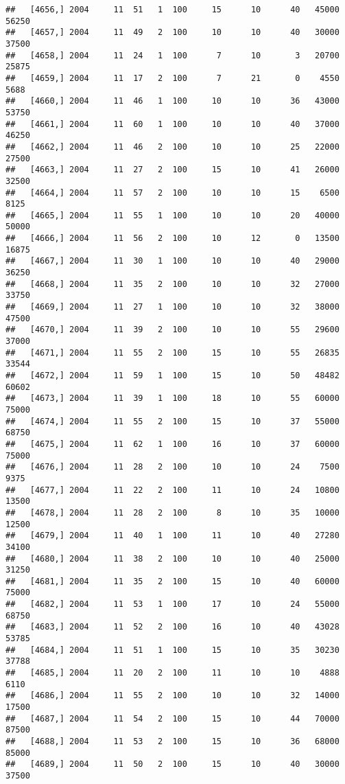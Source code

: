 \documentclass{article}\usepackage[]{graphicx}\usepackage[]{color}
\makeatletter
\newenvironment{kframe}{%
 \def\at@end@of@kframe{}%
 \ifinner\ifhmode%
  \def\at@end@of@kframe{\end{minipage}}%
  \begin{minipage}{\columnwidth}%
 \fi\fi%
 \def\FrameCommand##1{\hskip\@totalleftmargin \hskip-\fboxsep
 \colorbox{shadecolor}{##1}\hskip-\fboxsep
     \hskip-\linewidth \hskip-\@totalleftmargin \hskip\columnwidth}%
 \MakeFramed {\advance\hsize-\width
   \@totalleftmargin\z@ \linewidth\hsize
   \@setminipage}}%
 {\par\unskip\endMakeFramed%
 \at@end@of@kframe}
\newenvironment{knitrout}{}{} %
\makeatother
\begin{document}
\begin{knitrout}
\begin{kframe}
\begin{verbatim}
##   [4656,] 2004     11  51   1  100     15      10      40   45000   56250
##   [4657,] 2004     11  49   2  100     10      10      40   30000   37500
##   [4658,] 2004     11  24   1  100      7      10       3   20700   25875
##   [4659,] 2004     11  17   2  100      7      21       0    4550    5688
##   [4660,] 2004     11  46   1  100     10      10      36   43000   53750
##   [4661,] 2004     11  60   1  100     10      10      40   37000   46250
##   [4662,] 2004     11  46   2  100     10      10      25   22000   27500
##   [4663,] 2004     11  27   2  100     15      10      41   26000   32500
##   [4664,] 2004     11  57   2  100     10      10      15    6500    8125
##   [4665,] 2004     11  55   1  100     10      10      20   40000   50000
##   [4666,] 2004     11  56   2  100     10      12       0   13500   16875
##   [4667,] 2004     11  30   1  100     10      10      40   29000   36250
##   [4668,] 2004     11  35   2  100     10      10      32   27000   33750
##   [4669,] 2004     11  27   1  100     10      10      32   38000   47500
##   [4670,] 2004     11  39   2  100     10      10      55   29600   37000
##   [4671,] 2004     11  55   2  100     15      10      55   26835   33544
##   [4672,] 2004     11  59   1  100     15      10      50   48482   60602
##   [4673,] 2004     11  39   1  100     18      10      55   60000   75000
##   [4674,] 2004     11  55   2  100     15      10      37   55000   68750
##   [4675,] 2004     11  62   1  100     16      10      37   60000   75000
##   [4676,] 2004     11  28   2  100     10      10      24    7500    9375
##   [4677,] 2004     11  22   2  100     11      10      24   10800   13500
##   [4678,] 2004     11  28   2  100      8      10      35   10000   12500
##   [4679,] 2004     11  40   1  100     11      10      40   27280   34100
##   [4680,] 2004     11  38   2  100     10      10      40   25000   31250
##   [4681,] 2004     11  35   2  100     15      10      40   60000   75000
##   [4682,] 2004     11  53   1  100     17      10      24   55000   68750
##   [4683,] 2004     11  52   2  100     16      10      40   43028   53785
##   [4684,] 2004     11  51   1  100     15      10      35   30230   37788
##   [4685,] 2004     11  20   2  100     11      10      10    4888    6110
##   [4686,] 2004     11  55   2  100     10      10      32   14000   17500
##   [4687,] 2004     11  54   2  100     15      10      44   70000   87500
##   [4688,] 2004     11  53   2  100     15      10      36   68000   85000
##   [4689,] 2004     11  50   2  100     15      10      40   30000   37500

\end{verbatim}
\end{kframe}
\end{knitrout}
\end{document}
